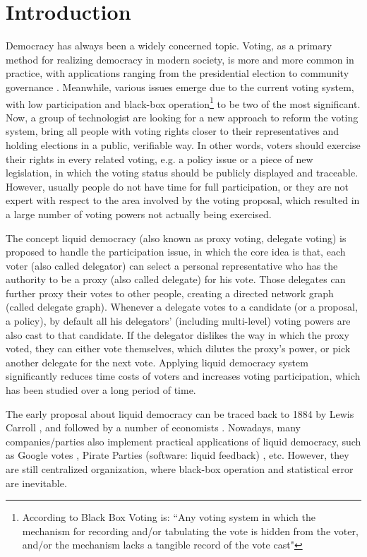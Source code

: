 \section{Introduction}
Democracy has always been a widely concerned topic. Voting, as a primary method for realizing democracy in modern society, is more and more common in practice, with applications ranging from the presidential election to community governance \cite{gerber1998primary,kohno2004analysis}. Meanwhile, various issues emerge due to the current voting system, with low participation \cite{birch2016full,kousser2007does} and black-box operation\cite{bannet2004hack,harris2004black}\footnote{According to \cite{harris2004black} Black Box Voting is: ``Any voting system in which the mechanism for recording and/or tabulating the vote is hidden from the voter, and/or the mechanism lacks a tangible record of the vote cast"} to be two of the most significant. Now, a group of technologist are looking for a new approach to reform the voting system, bring all people with voting rights closer to their representatives and holding elections in a public, verifiable way. In other words, voters should exercise their rights in every related voting, e.g. a policy issue or a piece of new legislation, in which the voting status should be publicly displayed and traceable. However, usually people do not have time for full participation, or they are not expert with respect to the area involved by the voting proposal, which resulted in a large number of voting powers not actually being exercised.

The concept liquid democracy (also known as proxy voting, delegate voting) is proposed to handle the participation issue, in which the core idea is that, each voter (also called delegator) can select a personal representative who has the authority to be a proxy (also called delegate) for his vote.  Those delegates can further proxy their votes to other people, creating a directed network graph (called delegate graph). Whenever a delegate votes to a candidate (or a proposal, a policy), by default all his delegators' (including multi-level) voting powers are also cast to that candidate. If the delegator dislikes the way in which the proxy voted, they can either vote themselves, which dilutes the proxy's power, or pick another delegate for the next vote. Applying liquid democracy system significantly reduces time costs of voters and increases voting participation, which has been studied over a long period of time.

The early proposal about liquid democracy can be traced back to 1884 by Lewis Carroll \cite{carroll1884principles}, and followed by a number of economists \cite{william1912primary,miller1969program,paulin2014through}. Nowadays, many companies/parties also implement practical applications of liquid democracy, such as Google votes \cite{hardt2015google}, Pirate Parties (software: liquid feedback) \cite{behrens2014principles}, etc. However, they are still centralized organization, where black-box operation and statistical error are inevitable.

